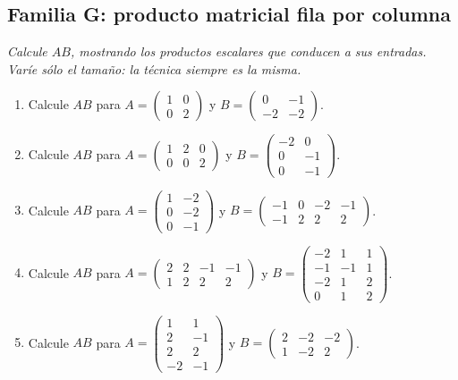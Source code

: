 \documentclass[12pt]{article}
\theoremstyle{remark}
\newcounter{contadorEjercicio}
\newenvironment{listaejercicios}{\begin{enumerate}[label=\textbf{E\arabic*.},leftmargin=2.4em,itemsep=0.52em]\setcounter{enumi}{\value{contadorEjercicio}}}{\setcounter{contadorEjercicio}{\value{enumi}}\end{enumerate}}
\begin{document}
\subsection{Familia G: producto matricial fila por columna}\noindent\textit{Calcule $AB$, mostrando los productos escalares que conducen a sus entradas. Varíe sólo el tamaño: la técnica siempre es la misma.}\par\medskip
\begin{listaejercicios}

\item Calcule $AB$ para $A=\begin{pmatrix}1&0\\0&2\end{pmatrix}$ y $B=\begin{pmatrix}0&-1\\-2&-2\end{pmatrix}$.

\item Calcule $AB$ para $A=\begin{pmatrix}1&2&0\\0&0&2\end{pmatrix}$ y $B=\begin{pmatrix}-2&0\\0&-1\\0&-1\end{pmatrix}$.

\item Calcule $AB$ para $A=\begin{pmatrix}1&-2\\0&-2\\0&-1\end{pmatrix}$ y $B=\begin{pmatrix}-1&0&-2&-1\\-1&2&2&2\end{pmatrix}$.

\item Calcule $AB$ para $A=\begin{pmatrix}2&2&-1&-1\\1&2&2&2\end{pmatrix}$ y $B=\begin{pmatrix}-2&1&1\\-1&-1&1\\-2&1&2\\0&1&2\end{pmatrix}$.

\item Calcule $AB$ para $A=\begin{pmatrix}1&1\\2&-1\\2&2\\-2&-1\end{pmatrix}$ y $B=\begin{pmatrix}2&-2&-2\\1&-2&2\end{pmatrix}$.


\end{listaejercicios}
\end{document}
